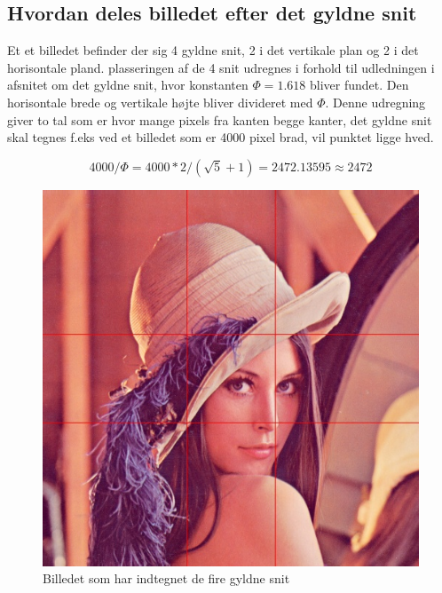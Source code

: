 

\subsection*{Hvordan deles billedet efter det gyldne snit}
Et et billedet befinder der sig 4 gyldne snit, 2 i det vertikale plan og
2 i det horisontale pland. plasseringen af de 4 snit udregnes i forhold
til udledningen i afsnitet om det gyldne snit, hvor konstanten $\varPhi
= 1.618$ bliver fundet. Den horisontale brede og vertikale højte bliver
divideret med $\varPhi$. Denne udregning giver to tal som er hvor mange
pixels fra kanten begge kanter, det gyldne snit skal tegnes f.eks ved et
billedet som er 4000 pixel brad, vil punktet ligge hved.

\begin{equation}
	4000/\varPhi = 4000*2/(\sqrt{5}+1) = 2472.13595 \approx 2472
\end{equation}

\begin{figure}[h]
	\begin{center}
		\includegraphics[scale=0.42,angle=0]{afsnit/vores_implementation/billeder/naiv_algoritme/Lenagolden}
	\end{center}
	\caption[]{Billedet som har indtegnet de fire gyldne snit}
	\label{f}
\end{figure}

